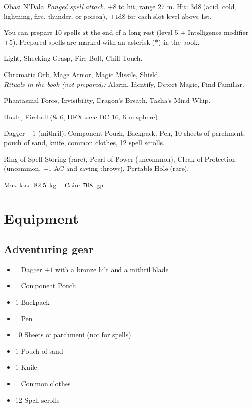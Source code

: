 \documentclass[letterpaper,twocolumn,openany,nodeprecatedcode,justified]{dndbook}
\begin{document}
\begin{DndMonster}{Obasi N'Dala}
  \textit{Ranged spell attack.} $+8$ to hit, range 27 m. Hit: 3d8 (acid,
  cold, lightning, fire, thunder, or poison), $+1$d8 for each slot level
  above 1st.


  You can prepare 10 spells at the end of a long rest (level 5 + Intelligence
  modifier $+5$). Prepared spells are marked with an asterisk ($\ast$) in
  the book.

  Light, Shocking Grasp, Fire Bolt, Chill Touch.

  Chromatic Orb, Mage Armor, Magic Missile, Shield.\\
  \emph{Rituals in the book (not prepared):} Alarm, Identify, Detect
  Magic, Find Familiar.

  Phantasmal Force, Invisibility, Dragon's Breath, Tasha's Mind Whip.

  Haste, Fireball (8d6, DEX save DC 16, 6 m sphere).

  Dagger $+1$ (mithril), Component Pouch, Backpack, Pen, 10 sheets of
  parchment, pouch of sand, knife, common clothes, 12 spell scrolls.

  Ring of Spell Storing (rare), Pearl of Power (uncommon), Cloak of
  Protection (uncommon, $+1$ AC and saving throws), Portable Hole
  (rare).

  Max load 82.5~kg -- Coin: 708~gp.
\end{DndMonster}

\chapter*{Equipment}
\section{Adventuring gear}
\begin{itemize}
  \item 1 Dagger $+1$ with a bronze hilt and a mithril blade
  \item 1 Component Pouch
  \item 1 Backpack
  \item 1 Pen
  \item 10 Sheets of parchment (not for spells)
  \item 1 Pouch of sand
  \item 1 Knife
  \item 1 Common clothes
  \item 12 Spell scrolls
\end{itemize}
\end{document}
